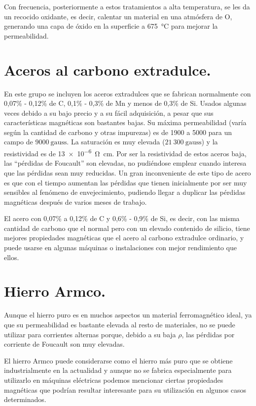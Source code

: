 \documentclass[12pt,a4paper]{article}
\begin{document}
Con frecuencia, posteriormente a estos tratamientos a alta temperatura, se les da un recocido oxidante, es decir, calentar un material en una atmósfera de O, generando una capa de óxido en la superficie a \SI{675}{\celsius} para mejorar la permeabilidad.

\section{Aceros al carbono extradulce.}

En este grupo se incluyen los aceros extradulces que se fabrican normalmente con 0,07\% - 0,12\% de C, 0,1\% - 0,3\% de Mn y menos de 0,3\% de Si. Usados algunas veces debido a su bajo precio y a su fácil adquisición, a pesar que sus características magnéticas son bastantes bajas. Su máxima permeabilidad (varía según la cantidad de carbono y otras impurezas) es de 1900 a 5000 para un campo de $9000 \ \mathrm{gauss}$. La saturación es muy elevada ($21\ 300 \ \mathrm{gauss}$) y la resistividad es de \SI{13e-6}{\ohm\centi\meter}. Por ser la resistividad de estos aceros baja, las \enquote{pérdidas de Foucault} son elevadas, no pudiéndose emplear cuando interesa que las pérdidas sean muy reducidas. Un gran inconveniente de este tipo de acero es que con el tiempo aumentan las pérdidas que tienen inicialmente por ser muy sensibles al fenómeno de envejecimiento, pudiendo llegar a duplicar las pérdidas magnéticas después de varios meses de trabajo.

El acero con 0,07\% a 0,12\% de C y 0,6\% - 0,9\% de Si, es decir, con las misma cantidad de carbono que el normal pero con un elevado contenido de silicio, tiene mejores propiedades magnéticas que el acero al carbono extradulce ordinario, y puede usarse en algunas máquinas o instalaciones con mejor rendimiento que ellos.

\section{Hierro Armco.}

Aunque el hierro puro es en muchos aspectos un material ferromagnético ideal, ya que su permeabilidad es bastante elevada al resto de materiales, no se puede utilizar para corrientes alternas porque, debido a su baja $\rho$, las pérdidas por corriente de Foucault son muy elevadas.

El hierro Armco puede considerarse como el hierro más puro que se obtiene industrialmente en la actualidad y aunque no se fabrica especialmente para utilizarlo en máquinas eléctricas podemos mencionar ciertas propiedades magnéticas que podrían resultar interesante para su utilización en algunos casos determinados.
\end{document}
